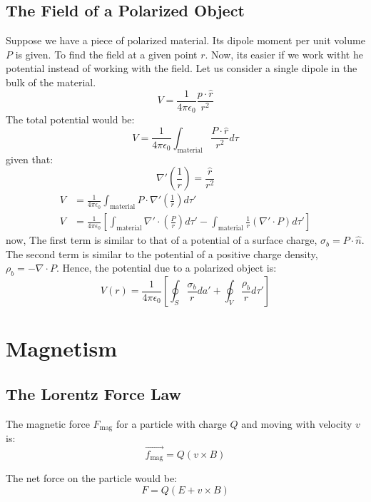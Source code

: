 \documentclass{article}
\begin{document}
\subsection{The Field of a Polarized Object}
Suppose we have a piece of polarized material. Its dipole moment per unit volume $P$ is given.
To find the field at a given point $r$. Now, its easier if we work witht he potential instead of working with the field. Let us consider a single dipole in the bulk of the material.\\
\[ V = \frac{1}{4 \pi \epsilon_0} \frac{p \cdot \hat{r}}{r^2} \]
The total potential would be:
\[ V = \frac{1}{4 \pi \epsilon_0}  \int_{\text{material}} \frac{P \cdot \hat{r}}{r^2} d\tau \]
given that:
\[ \nabla' \left(\frac{1}{r}\right) = \frac{\hat{r}}{r^2} \] 
\begin{align*}
    V &= \frac{1}{4 \pi \epsilon_0} \int_{\text{material}} P \cdot \nabla' \left(\frac{1}{r}\right) d\tau' \\
    V &= \frac{1}{4 \pi \epsilon_0} \left[ \int_{\text{material}} \nabla '\cdot \left( \frac{P}{r}\right) d\tau ' - \int_{\text{material}} \frac{1}{r} \left( \nabla ' \cdot P \right) d \tau' \right] 
\end{align*}
now, The first term is similar to that of a potential of a surface charge, $\sigma_b = P \cdot \hat{n}$.
The second term is similar to the potential of a positive charge density, $\rho_b = - \nabla \cdot P$.
Hence, the potential due to a polarized object is:
\[ V(r) = \frac{1}{4 \pi \epsilon_0} \left[ \oint_{S} \frac{\sigma_b}{r} da' + \oint_{V} \frac{\rho_b}{r} d\tau ' \right] \]


\section{Magnetism}
\subsection{The Lorentz Force Law}
The magnetic force $F_{\text{mag}}$ for a particle with charge $Q$ and moving with velocity $v$ is:
\[ \vec{f_{\text{mag}}} = Q (v \times B) \]

The net force on the particle would be:
\[ F = Q (E + v \times B ) \]
\end{document}
